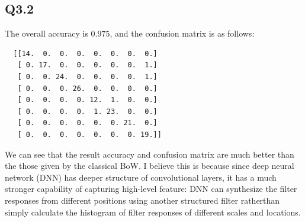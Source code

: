 \documentclass[11pt]{article}
\begin{document}

\newpage

\subsection*{Q3.2}

The overall accuracy is $0.975$, and the confusion matrix is as follows:

\begin{verbatim}
  [[14.  0.  0.  0.  0.  0.  0.  0.]
   [ 0. 17.  0.  0.  0.  0.  0.  1.]
   [ 0.  0. 24.  0.  0.  0.  0.  1.]
   [ 0.  0.  0. 26.  0.  0.  0.  0.]
   [ 0.  0.  0.  0. 12.  1.  0.  0.]
   [ 0.  0.  0.  0.  1. 23.  0.  0.]
   [ 0.  0.  0.  0.  0.  0. 21.  0.]
   [ 0.  0.  0.  0.  0.  0.  0. 19.]]
\end{verbatim}

We can see that the result accuracy and confusion matrix are much better than the those given by the classical BoW. I believe this is because since deep neural network (DNN) has deeper structure of convolutional layers, it has a much stronger capability of capturing high-level feature: DNN can synthesize the filter responses from different positions using another structured filter ratherthan simply calculate the histogram of filter responses of different scales and locations.
\end{document}
